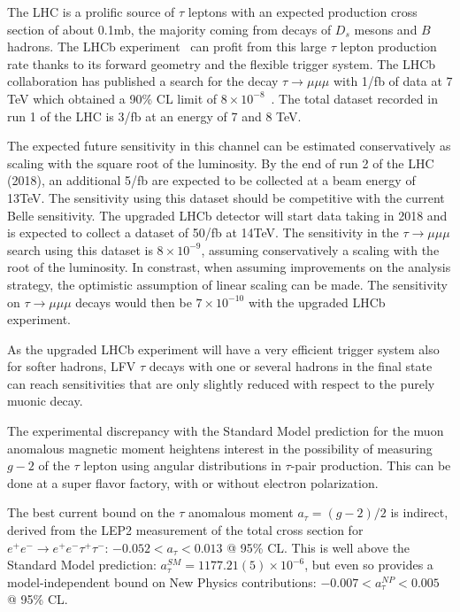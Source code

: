 
The LHC is a prolific source of $\tau$ leptons with an expected
production cross section of about 0.1mb, the majority coming from 
decays of $D_s$ mesons and $B$ hadrons.  
The LHCb experiment~\cite{Alves:2008zz} can profit from this large $\tau$ lepton
production rate thanks to its forward geometry and the flexible
trigger system. The LHCb collaboration has published a search for the
decay $\tau \to \mu\mu\mu$ with 1/fb of data at 7 TeV which  obtained a 90\% CL
limit of $8 \times 10^{-8}$~\cite{Aaij:2013fia}. The total dataset recorded in run 1 of the
LHC is 3/fb at an energy of 7 and 8 TeV.

The expected future sensitivity in this channel can be estimated
conservatively as scaling with the square root of the luminosity. By the end
of run 2 of the LHC (2018), an additional 5/fb are expected to be
collected at a beam energy of 13TeV. The sensitivity using this
dataset should be competitive with the current Belle sensitivity. 
The upgraded LHCb detector will start data taking in 2018 and is
expected to collect a dataset of 50/fb at 14TeV.
The sensitivity in the $\tau \to \mu\mu\mu$ search using this dataset is $8\times
10^{-9}$, assuming conservatively a scaling with the root of the
luminosity. In constrast, when assuming improvements on the analysis
strategy, the optimistic assumption of linear scaling can be made. The
sensitivity on $\tau \to \mu\mu\mu$ decays would then be $7 \times 10^{-10}$ with the
upgraded LHCb experiment. 

As the upgraded LHCb experiment will have a very efficient trigger
system also for softer hadrons, LFV $\tau$ decays with one or several
hadrons in the final state can reach sensitivities that are only slightly reduced
with respect to the purely muonic decay. 

The experimental discrepancy with the Standard Model prediction for
the muon anomalous magnetic moment heightens interest in the
possibility of measuring $g-2$ of the $\tau$ lepton using angular
distributions in $\tau$-pair production. This can be done at a super flavor factory, with or without electron polarization.  

The best current bound on the $\tau$ anomalous moment  $a_{\tau}=(g-2)/2$ is indirect, derived from the LEP2 measurement of the total cross section for $e^+e^- \rightarrow e^+e^- \tau^+\tau^-$: $-0.052 < a_\tau < 0.013$ @ 95\% CL. This is well above the Standard Model prediction: $a_\tau^{SM} = 1177.21(5) \times 10^{-6}$, but even so provides a model-independent bound on New Physics contributions:  $-0.007 < a_\tau^{NP} < 0.005$ @ 95\% CL.  \cite{GonzalezSprinberg:2000mk}

